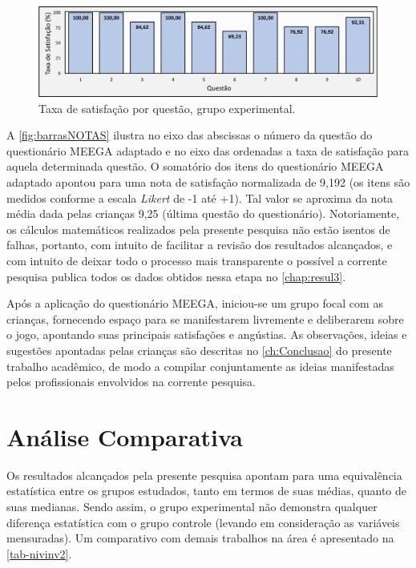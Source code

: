 \begin{figure}[htb]
    \caption{\label{fig:barrasNOTAS}Taxa de satisfação por questão, grupo experimental.}
    \includegraphics[width=\linewidth]{./Visuais/NotasTaxa.pdf}
\end{figure}

A \autoref{fig:barrasNOTAS} ilustra no eixo das abscissas o número da questão do questionário \ac{MEEGA} adaptado e no eixo das ordenadas a taxa de satisfação para aquela determinada questão. O somatório dos itens do questionário \ac{MEEGA} adaptado apontou para uma nota de satisfação normalizada de 9,192 (os itens são medidos conforme a escala \textit{Likert} de -1 até +1). Tal valor se aproxima da nota média dada pelas crianças 9,25 (última questão do questionário). Notoriamente, os cálculos matemáticos realizados pela presente pesquisa não estão isentos de falhas, portanto, com intuito de facilitar a revisão dos resultados alcançados, e com intuito de deixar todo o processo mais transparente o possível a corrente pesquisa publica todos os dados obtidos nessa etapa no \autoref{chap:resul3}.

Após a aplicação do questionário \ac{MEEGA}, iniciou-se um grupo focal com as crianças, fornecendo espaço para se manifestarem livremente e deliberarem sobre o jogo, apontando suas principais satisfações e angústias. As observações, ideias e sugestões apontadas pelas crianças são descritas no \autoref{ch:Conclusao} do presente trabalho acadêmico, de modo a compilar conjuntamente as ideias manifestadas pelos profissionais envolvidos na corrente pesquisa.



\section{Análise Comparativa}\label{sec:compilar}

Os resultados alcançados pela presente pesquisa apontam para uma equivalência estatística entre os grupos estudados, tanto em termos de suas médias, quanto de suas medianas. Sendo assim, o grupo experimental não demonstra qualquer diferença estatística com o grupo controle (levando em consideração as variáveis mensuradas). Um comparativo com demais trabalhos na área é apresentado na \autoref{tab-nivinv2}.


